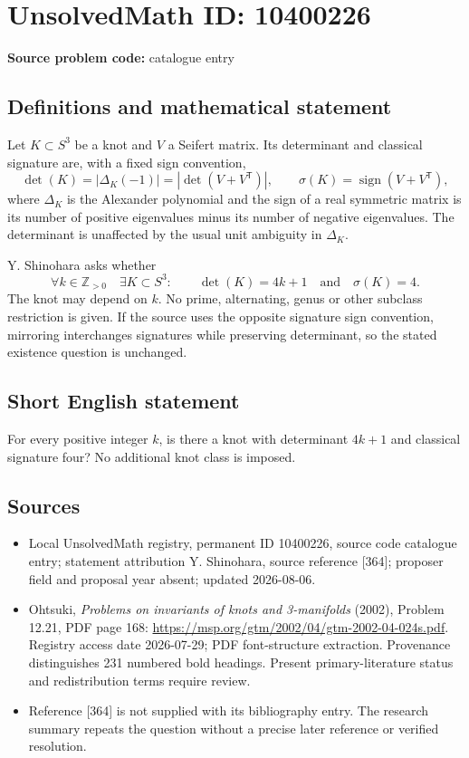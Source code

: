 \documentclass[11pt]{article}
\newcommand{\Z}{\mathbb{Z}}
\begin{document}
\section*{UnsolvedMath ID: 10400226}
\textbf{Source problem code:} catalogue entry
\subsection{Definitions and mathematical statement}
Let \(K\subset S^3\) be a knot and \(V\) a Seifert matrix. Its determinant and classical signature are, with a fixed sign convention,
\[
 \det(K)=|\Delta_K(-1)|=|\det(V+V^{\mathsf T})|,\qquad
 \sigma(K)=\operatorname{sign}(V+V^{\mathsf T}),
\]
where \(\Delta_K\) is the Alexander polynomial and the sign of a real symmetric matrix is its number of positive eigenvalues minus its number of negative eigenvalues. The determinant is unaffected by the usual unit ambiguity in \(\Delta_K\).

Y. Shinohara asks whether
\[
 \forall k\in\Z_{>0}\quad\exists K\subset S^3:\qquad
 \det(K)=4k+1\quad\text{and}\quad\sigma(K)=4.
\]
The knot may depend on \(k\). No prime, alternating, genus or other subclass restriction is given. If the source uses the opposite signature sign convention, mirroring interchanges signatures while preserving determinant, so the stated existence question is unchanged.
\subsection{Short English statement}
For every positive integer \(k\), is there a knot with determinant \(4k+1\) and classical signature four? No additional knot class is imposed.
\subsection{Sources}
\begin{itemize}
\item Local UnsolvedMath registry, permanent ID 10400226, source code catalogue entry; statement attribution Y. Shinohara, source reference [364]; proposer field and proposal year absent; updated 2026-08-06.
\item Ohtsuki, \emph{Problems on invariants of knots and 3-manifolds} (2002), Problem 12.21, PDF page 168: \url{https://msp.org/gtm/2002/04/gtm-2002-04-024s.pdf}. Registry access date 2026-07-29; PDF font-structure extraction. Provenance distinguishes 231 numbered bold headings. Present primary-literature status and redistribution terms require review.
\item Reference [364] is not supplied with its bibliography entry. The research summary repeats the question without a precise later reference or verified resolution.
\end{itemize}
\end{document}

